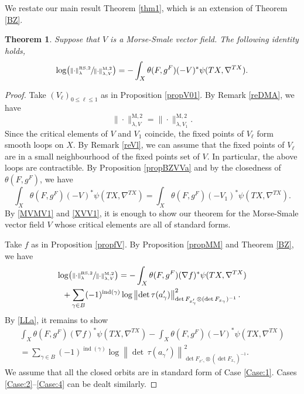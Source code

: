 \documentclass[JEP,XML,SOM,Unicode]{cedram}
\newcommand{\rM}{\mathrm{M}}
\newcommand{\RS}{\mathrm{RS}}
\theoremstyle{plain}
\newtheorem{thm}[lem]{Theorem}
\theoremstyle{definition}
\theoremstyle{remark}
\DeclareMathOperator{\ind}{ind}
\let\l\leqslant
\begin{document}
We restate our main
result Theorem \ref{thm1}, which is an extension of Theorem \ref{BZ}.
\begin{thm}\label{Thm1}
Suppose that $V$ is a Morse-Smale vector field. The following identity holds,
\begin{equation*}
\log\bigl(\sfrac{\|{\cdot}\|^{\RS,2}_{\lambda}}{\|{\cdot}\|^{\rM,2}_{\lambda,V}}\bigr)=-\int_{X}\theta(F,g^{F})(-V)^{*}\psi(TX,\nabla^{TX}).
\end{equation*}
\end{thm}
\begin{proof}
Take $(V_{\ell})_{0\l \ell\l 1}$ as in Proposition
\ref{propV01}.
By Remark \ref{reDMA}, we have
\begin{equation}\label{MVMV1}
\|{\cdot}\|^{\rM,2}_{\lambda,V}=\|{\cdot}\|^{\rM,2}_{\lambda,V_{1}}.
\end{equation}
Since the critical elements of $V$ and $V_{1}$ coincide, the fixed points of $V_{\ell}$ form smooth loops on $X$. By Remark \ref{reVl}, we can assume that the fixed points of $V_{\ell}$ are in a small neighbourhood of
the fixed points set of $V$. In particular, the above loops are
contractible. By Proposition \ref{propBZVVa} and by the closedness of $\theta(F,g^{F})$, we have
\begin{equation}\label{XVV1}
\int_{X}\theta(F,g^{F})(-V)^{*}\psi(TX,
\nabla^{TX})=\int_{X}\theta(F,g^{F})(-V_{1})^{*}\psi(TX, \nabla^{TX}).
\end{equation}
By \eqref{MVMV1} and \eqref{XVV1}, it is enough to show our theorem
for the Morse-Smale vector field $V$ whose critical elements are all
of standard forms.

Take $f$ as in Proposition
\ref{propfV}.
By Proposition \ref{propMM} and Theorem \ref{BZ}, we have
\begin{multline}\label{LLa}
\log\bigl(\sfrac{\|{\cdot}\|^{\RS,2}_{\lambda}}{\|{\cdot}\|^{\rM,2}_{\lambda,V}}\bigr)=-\int_{X}\theta(F,g^{F})(\nabla f)^{*}\psi(TX, \nabla ^{TX})\\
+\sum_{\gamma\in
B}(-1)^{\ind(\gamma)}\log
\left\|{\det\,}\tau(a_{\gamma}')\right\|^{2}_{\det
F_{x'_{\gamma}}\otimes (\det
F_{x_{\gamma}})^{-1}}.
\end{multline}
By \eqref{LLa}, it remains to show
\begin{multline}\label{eqaaa}
\int_{X}\theta(F,g^{F})(\nabla
f)^{*}\psi(TX,
\nabla^{TX})-\int_{X}\theta(F,g^{F})(-V)^{*}\psi(TX,\nabla^{TX})\\
=\sum_{\gamma\in
B}(-1)^{\ind(\gamma)}\log
\left\|{\det\,}\tau(a_{\gamma}')\right\|^{2}_{\det
F_{x'_{\gamma}}\otimes (\det
F_{x_{\gamma}})^{-1}}.
\end{multline}
We assume that all the closed orbits are in standard form
of Case \ref{Case:1}. Cases \ref{Case:2}--\ref{Case:4} can be dealt similarly.


\end{proof}
\end{document}
